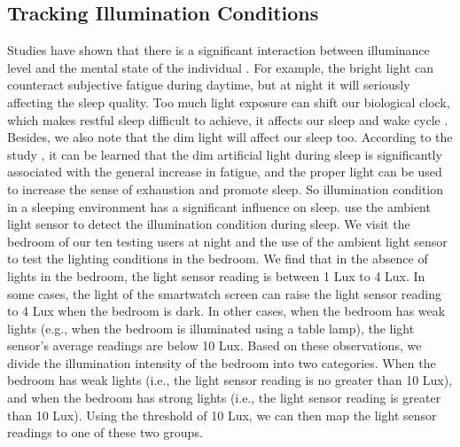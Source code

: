 \subsection{Tracking Illumination Conditions \label{sec:illumination}}
Studies have shown that there is a significant interaction between illuminance level and the mental state of the individual \cite{light77}.
For example, the bright light can counteract subjective fatigue during daytime, but at night it will seriously affecting the sleep quality.
Too much light exposure can shift our biological clock, which makes restful sleep difficult to achieve, it affects our sleep and wake cycle
\cite{light2007}.  Besides, we also note that the dim light will affect our sleep too. According to the study \cite{light2016}, it can be
learned that the dim artificial light during sleep is significantly associated with the general increase in fatigue, and the proper light
can be used to increase the sense of exhaustion and promote sleep. So illumination condition in a sleeping environment has a significant
influence on sleep. {\systemname} use the ambient light sensor to detect the illumination condition during sleep. We visit the bedroom of
our ten testing users at night and the use of the ambient light sensor to test the lighting conditions in the bedroom. We
find that in the absence of lights in the bedroom, the light sensor reading is between 1 Lux to 4 Lux. In some cases, the light of the
smartwatch screen can raise the light sensor reading to 4 Lux when the bedroom is dark. In other cases, when the bedroom has weak lights
(e.g., when the bedroom is illuminated using a table lamp), the light sensor's average readings are below 10 Lux. Based on these
observations, we divide the illumination intensity of the bedroom into two categories. When the bedroom has weak lights (i.e., the light
sensor reading is no greater than 10 Lux), and when the bedroom has strong lights (i.e., the light sensor reading is greater than 10 Lux). 
Using the threshold of 10 Lux, we can then map the light sensor readings to one of these two groups.


